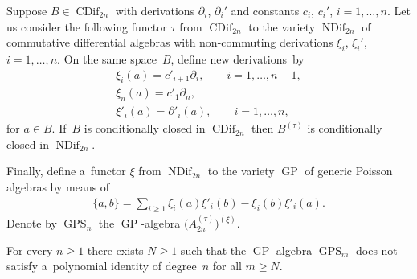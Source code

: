 \documentclass[pdftex]{sigma}
\begin{document}
Suppose $B\in \operatorname{CDif}_{2n}$ with derivations $\partial_i$, $\partial_i'$ and constants $c_i$, $c_i'$, $i=1,\dots, n$.
Let us consider the following functor $\tau $ from $\operatorname{CDif}_{2n}$ to the variety $\operatorname{NDif}_{2n}$ of commutative dif\/ferential
algebras with non-commuting derivations $\xi_i$, $\xi_i'$, $i=1,\dots, n$.
On the same space~$B$, def\/ine new derivations~by
\begin{gather*}
\xi_i(a) = c'_{i+1}\partial_i,
\qquad
i=1,\dots, n-1,
\\
\xi_n(a) = c'_1\partial_n,
\\
\xi'_i(a) = \partial'_i(a),
\qquad
i=1,\dots, n,
\end{gather*}
for $a\in B$.
If~$B$ is conditionally closed in $\operatorname{CDif}_{2n}$ then $B^{(\tau)}$ is conditionally closed in $\operatorname{NDif}_{2n}$.

Finally, def\/ine a~functor $\xi $ from $\operatorname{NDif}_{2n}$ to the variety $\operatorname{GP}$ of generic Poisson algebras by means of
\begin{gather*}
\{a,b\} = \sum\limits_{i\ge 1} \xi_i(a)\xi'_i(b) - \xi_i(b)\xi'_i(a).
\end{gather*}
Denote by $\operatorname{GPS}_n$ the $\operatorname{GP}$-algebra $\big(A_{2n}^{(\tau)} \big)^{(\xi)}$.

\begin{proposition}
\label{prop:NonPIGPS}
For every $n\ge 1$ there exists $N\ge 1$ such that the $\operatorname{GP}$-algebra $\operatorname{GPS}_{m}$ does not satisfy a~polynomial identity of
degree~$n$ for all $m\ge N$.
\end{proposition}
\end{document}
